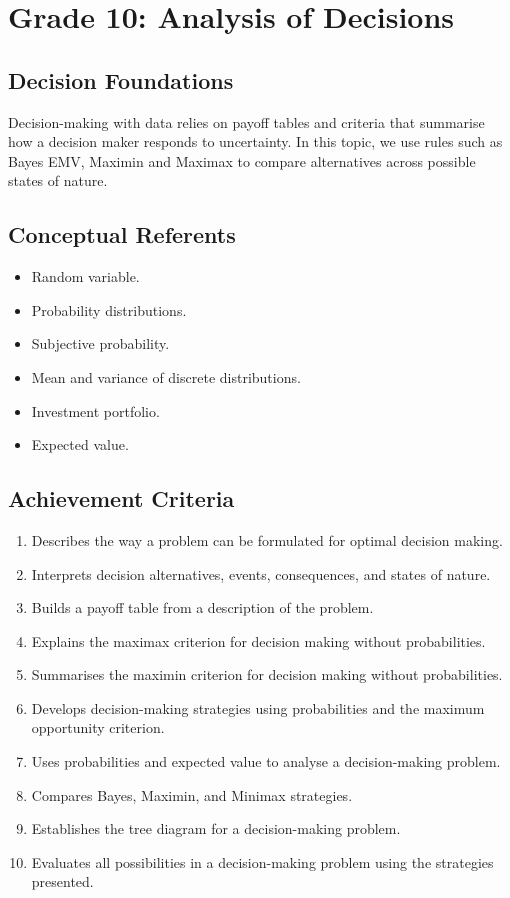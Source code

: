 \chapter{Grade 10: Analysis of Decisions}\label{sec:grade10-analysis}

\section{Decision Foundations}\label{sec:decision-foundations}

Decision-making with data relies on payoff tables and criteria that summarise how a decision maker responds to uncertainty.
In this topic, we use rules such as Bayes EMV, Maximin and Maximax to compare alternatives across possible states of nature.

\section{Conceptual Referents}\label{sec:conceptual-referents}

\begin{itemize}
	\item Random variable.
	\item Probability distributions.
	\item Subjective probability.
	\item Mean and variance of discrete distributions.
	\item Investment portfolio.
	\item Expected value.
\end{itemize}

\section{Achievement Criteria}\label{sec:achievement-criteria}

\begin{enumerate}
	\item Describes the way a problem can be formulated for optimal decision making.
	\item Interprets decision alternatives, events, consequences, and states of nature.
	\item Builds a payoff table from a description of the problem.
	\item Explains the maximax criterion for decision making without probabilities.
	\item Summarises the maximin criterion for decision making without probabilities.
	\item Develops decision-making strategies using probabilities and the maximum opportunity criterion.
	\item Uses probabilities and expected value to analyse a decision-making problem.
	\item Compares Bayes, Maximin, and Minimax strategies.
	\item Establishes the tree diagram for a decision-making problem.
	\item Evaluates all possibilities in a decision-making problem using the strategies presented.
\end{enumerate}

